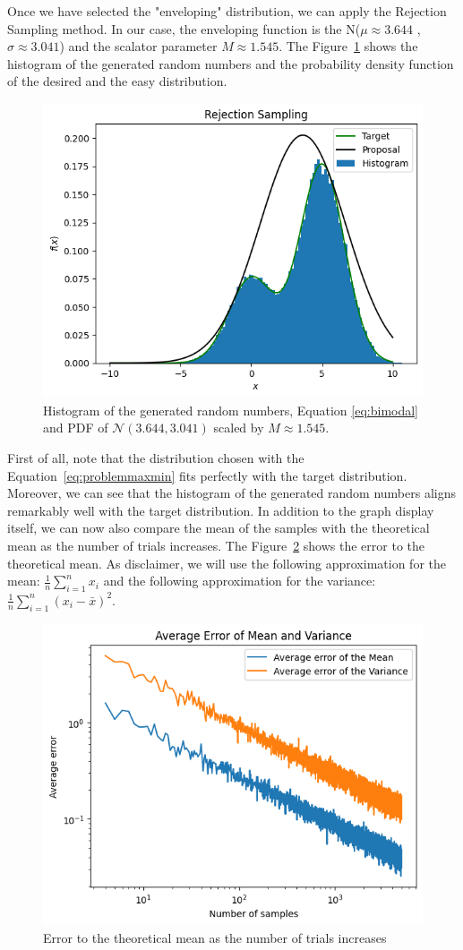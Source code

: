 \documentclass{article}
\begin{document}
Once we have selected the "enveloping" distribution, we can apply the Rejection Sampling method. In our case, the enveloping function is the N(\(\mu \approx 3.644\) ,\(\sigma \approx 3.041\)) and the scalator parameter \(M \approx 1.545\). The Figure~\ref{fig:rejectionmethod} shows the histogram of the generated random numbers and the probability density function of the desired and the easy distribution.

\begin{figure}[H]
	\centering
	\includegraphics[width=0.5\linewidth]{./Figures/AcceptanceRejection/hist.png}
	\caption{Histogram of the generated random numbers, Equation \eqref{eq:bimodal} and PDF of \(\mathcal{N}(3.644,3.041)\) scaled by \(M \approx 1.545\).}
	\label{fig:rejectionmethod}
\end{figure}

First of all, note that the distribution chosen with the Equation~\ref{eq:problemmaxmin} fits perfectly with the target distribution. Moreover, we can see that the histogram of the generated random numbers aligns remarkably well with the target distribution. In addition to the graph display itself, we can now also compare the mean of the samples with the theoretical mean as the number of trials increases. The Figure~\ref{fig:rejectionerror} shows the error to the theoretical mean. As disclaimer, we will use the following approximation for the mean: \(\frac{1}{n}\sum_{i=1}^{n} x_i\) and the following approximation for the variance: \(\frac{1}{n}\sum_{i=1}^{n} (x_i - \bar{x})^2\).

\begin{figure}[H]
	\centering
	\includegraphics[width=0.5\linewidth]{./Figures/AcceptanceRejection/error_linear_regression.png}
	\caption{Error to the theoretical mean as the number of trials increases}
	\label{fig:rejectionerror}
\end{figure}
\end{document}
